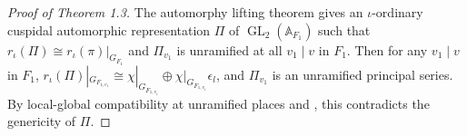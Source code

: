 \documentclass[10pt]{article}
\theoremstyle{definition}
\numberwithin{equation}{theorem}
\newcommand{\AAA}{\mathbb{A}}
\DeclareMathOperator{\GL}{GL}
\begin{document}
\begin{proof}[Proof of Theorem 1.3]
The automorphy lifting theorem gives an $\iota$-ordinary cuspidal automorphic representation $\Pi$ of $\GL_2(\AAA_{F_1})$ such that $r_{\iota}(\Pi)\cong r_{\iota}(\pi)|_{G_{F_1}}$ and $\Pi_{v_1}$ is unramified at all $v_1\mid v$ in $F_1$. Then for any $v_1\mid v$ in $F_1$, $r_{\iota}(\Pi)|_{G_{F_{1,v_1}}}\cong \chi|_{G_{F_{1,v_1}}}\oplus\chi|_{G_{F_{1,v_1}}}\epsilon_l$, and $\Pi_{v_1}$ is an unramified principal series. By local-global compatibility at unramified places \cite{HLTT16} and \cite[Theorem~1]{Var14}, this contradicts the genericity of $\Pi$.
\end{proof}




\end{document}
